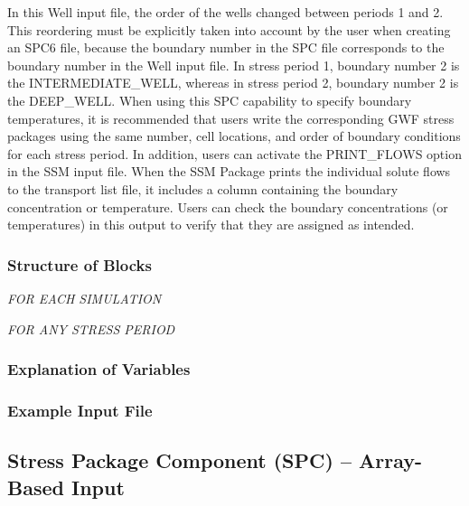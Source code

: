 \noindent In this Well input file, the order of the wells changed between periods 1 and 2.  This reordering must be explicitly taken into account by the user when creating an SPC6 file, because the boundary number in the SPC file corresponds to the boundary number in the Well input file.  In stress period 1, boundary number 2 is the INTERMEDIATE\_WELL, whereas in stress period 2, boundary number 2 is the DEEP\_WELL.  When using this SPC capability to specify boundary temperatures, it is recommended that users write the corresponding GWF stress packages using the same number, cell locations, and order of boundary conditions for each stress period.   In addition, users can activate the PRINT\_FLOWS option in the SSM input file.  When the SSM Package prints the individual solute flows to the transport list file, it includes a column containing the boundary concentration or temperature.  Users can check the boundary concentrations (or temperatures) in this output to verify that they are assigned as intended.

\vspace{5mm}
\subsubsection{Structure of Blocks}
\vspace{5mm}

\noindent \textit{FOR EACH SIMULATION}


\vspace{5mm}
\noindent \textit{FOR ANY STRESS PERIOD}


\vspace{5mm}
\subsubsection{Explanation of Variables}
\begin{description}

\end{description}

\subsubsection{Example Input File}


\newpage
\subsection{Stress Package Component (SPC) -- Array-Based Input}


